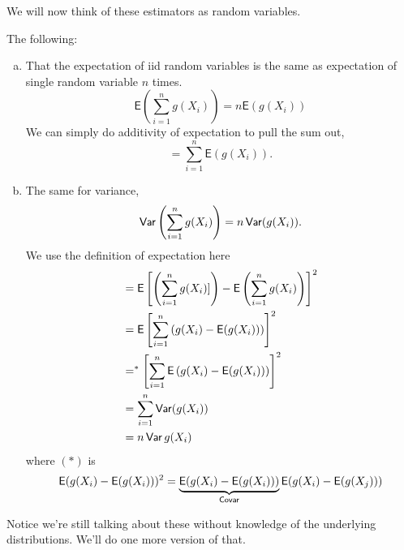 We will now think of these estimators as random variables.
\begin{theorem}
    The following:
    \begin{enumerate}[a)]
        \item That the expectation of iid random variables is the same as expectation of single random variable $n$ times.
              \[\mathsf{E}\left( \sum^n_{i=1} g(X_i) \right) = n\mathsf{E}(g(X_i))\]
              We can simply do additivity of expectation to pull the sum out,
              \[=\sum^n_{i=1}\mathsf{E}(g(X_i)).\]
        \item The same for variance,
              \[\mathsf{Var}\left( \sum^n_{i=1} g(X_i) \right) = n\operatorname{\mathsf{Var}}(g(X_i)).\]
              We use the definition of expectation here
              \begin{align*}
                   & = \operatorname{\mathsf{E}}\left[ \left(\sum^n_{i=1}g(X_i)]\right) - \operatorname{\mathsf{E}}\left( \sum^n_{i=1} g(X_i) \right) \right]^2 \\
                   & = \operatorname{\mathsf{E}}\left[ \sum^n_{i=1} \left( g(X_i) - \operatorname{\mathsf{E}}(g(X_i))\right) \right]^2                          \\
                   & =^* \left[ \sum^n_{i=1} \operatorname{\mathsf{E}}\left( g(X_i) - \operatorname{\mathsf{E}}(g(X_i)) \right) \right]^2                       \\
                   & = \sum^n_{i=1}\operatorname{\mathsf{Var}}(g(X_i))                                                                   \\
                   & = n\operatorname{\mathsf{Var}} g(X_i)
              \end{align*}
              where $(*)$ is %
              \begin{align*}
                  \operatorname{\mathsf{E}}(g(X_i) - \operatorname{\mathsf{E}}(g(X_i)))^2 = \underbrace{\operatorname{\mathsf{E}}(g(X_i) - \operatorname{\mathsf{E}}(g(X_i)))}_{\mathsf{Covar}} \operatorname{\mathsf{E}}(g(X_i) - \operatorname{\mathsf{E}}(g(X_j)))
              \end{align*}
    \end{enumerate}
\end{theorem}
Notice we're still talking about these without knowledge of the underlying distributions. We'll do one more version of that.

